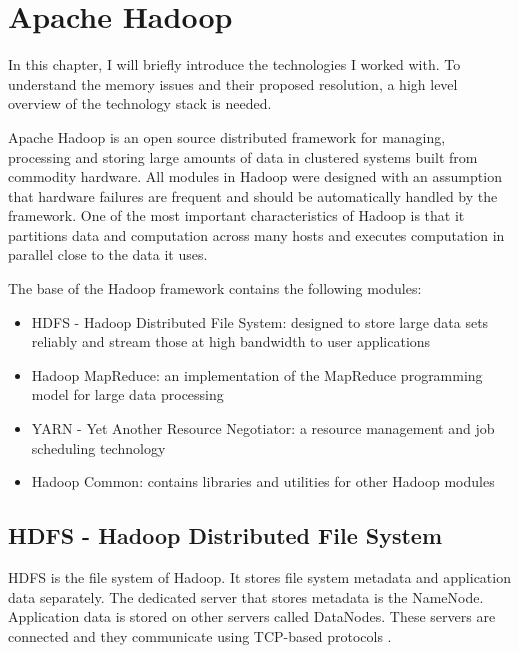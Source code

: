 \chapter{Apache Hadoop}
In this chapter, I will briefly introduce the technologies I worked with. To understand the memory issues and their proposed resolution, a high level overview of the technology stack is needed.

Apache Hadoop is an open source distributed framework for managing, processing and storing large amounts of data in clustered systems built from commodity hardware. All modules in Hadoop were designed with an assumption that hardware failures are frequent and should be automatically handled by the framework. One of the most important characteristics of Hadoop is that it partitions data and computation across many hosts and executes computation in parallel close to the data it uses.  \cite{Hadoop-wiki}

\noindent The base of the Hadoop framework contains the following modules:
\begin{itemize}
	\item HDFS - Hadoop Distributed File System: designed to store large data sets reliably and stream those at high bandwidth to user applications
	\item Hadoop MapReduce: an implementation of the MapReduce programming model for large data processing
	\item YARN - Yet Another Resource Negotiator: a resource management and job scheduling technology
	\item Hadoop Common: contains libraries and utilities for other Hadoop modules
\end{itemize}

\section{HDFS - Hadoop Distributed File System}
HDFS is the file system of Hadoop. It stores file system metadata and application data separately. The dedicated server that stores metadata is the NameNode. Application data is stored on other servers called DataNodes. These servers are connected and they communicate using TCP-based protocols \cite{Shvachko:2010:HDF:1913798.1914427}. 

